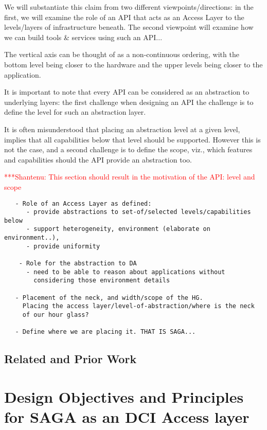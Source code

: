 \documentclass[a4paper,12pt]{article}
\newcommand{\jhanote}[1]{  {\textcolor{red}  { ***Shantenu: #1 }}}
\newcommand{\jhanote}[1]{}
\begin{document}
We will substantiate this claim from two different
viewpoints/directions: in the first, we will examine the role of an
API that acts as an Access Layer to the levels/layers of
infrastructure beneath. The second viewpoint will examine how we can
build tools \& services using such an API...

The vertical axis can be thought of as a non-continuous ordering, with
the bottom level being closer to the hardware and the upper levels
being closer to the application.

It is important to note that every API can be considered as an
abstraction to underlying layers: the first challenge when designing
an API the challenge is to define the level for such an abstraction
layer.  

It is often misunderstood that placing an abstraction level at a given
level, implies that all capabilities below that level should be
supported. However this is not the case, and a second challenge is to
define the scope, viz., which features and capabilities should the API
provide an abstraction too.

\jhanote{This section should result in the motivation of the API:
  level and scope}


\begin{verbatim}
   - Role of an Access Layer as defined:
      - provide abstractions to set-of/selected levels/capabilities below
      - support heterogeneity, environment (elaborate on environment..), 
      - provide uniformity

    - Role for the abstraction to DA 
      - need to be able to reason about applications without 
        considering those environment details

   - Placement of the neck, and width/scope of the HG.
     Placing the access layer/level-of-abstraction/where is the neck
     of our hour glass?

   - Define where we are placing it. THAT IS SAGA...
\end{verbatim}

\subsection{Related and Prior Work}
% 
\section{Design Objectives and Principles for SAGA as an DCI Access layer}
\label{sec:obj}
\end{document}
